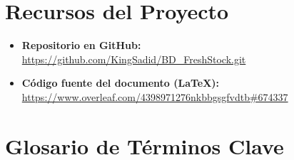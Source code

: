 \documentclass[journal]{IEEEtran}
\begin{document}
	\section{Recursos del Proyecto}
	\label{apx:recursos}
	
	\begin{itemize}[leftmargin=*, label=\textbullet]
		\item \textbf{Repositorio en GitHub:}\\
		\url{https://github.com/KingSadid/BD_FreshStock.git}
		
		\item \textbf{C\'{o}digo fuente del documento (\LaTeX{}):}\\
		\url{https://www.overleaf.com/4398971276nkbbgsgfvdtb#674337}
	\end{itemize}
	
	\section{Glosario de T\'{e}rminos Clave}
	\label{apx:glosario}
	
\end{document}
